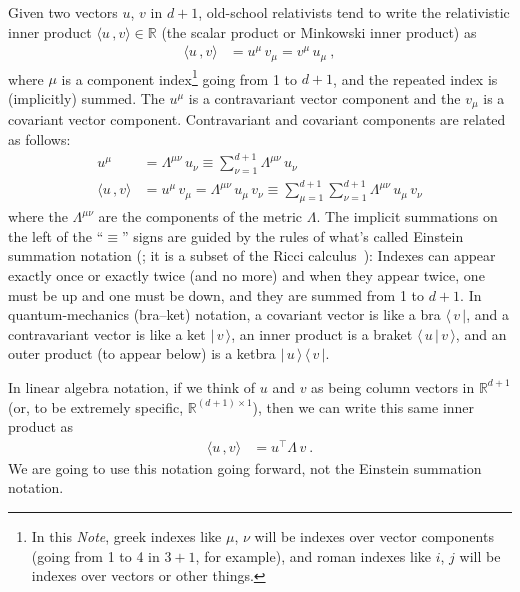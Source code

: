 \documentclass{article}
\newcommand{\inner}[2]{\langle{#1}\,,{#2}\rangle}
\newcommand{\bra}[1]{\langle\,{#1}\,|}
\newcommand{\ket}[1]{|\,{#1}\,\rangle}
\newcommand{\braket}[2]{\langle\,{#1}\,|\,{#2}\,\rangle}
\newcommand{\ketbra}[2]{|\,{#1}\,\rangle\,\langle\,{#2}\,|}
\newcommand{\plus}{\!+\!} %
\newcommand{\documentname}{\textsl{Note}}
\begin{document}
Given two vectors $u$, $v$ in $d\plus1$, old-school relativists tend to write the relativistic inner product $\inner{u}{v}\in\mathbb{R}$ (the scalar product or Minkowski inner product) as
\begin{align}
    \inner{u}{v} &= u^\mu\,v_\mu = v^\mu\,u_\mu ~,
\end{align}
where $\mu$ is a component index\footnote{In this \documentname{}, greek indexes like $\mu$, $\nu$ will be indexes over vector components (going from 1 to 4 in $3\plus1$, for example), and roman indexes like $i$, $j$ will be indexes over vectors or other things.} going from 1 to $d\plus1$, and the repeated index is (implicitly) summed.
The $u^\mu$ is a contravariant vector component and the $v_\mu$ is a covariant vector component.
Contravariant and covariant components are related as follows:
\begin{align}
    u^\mu &= \Lambda^{\mu\nu}\,u_\nu \equiv \sum_{\nu=1}^{d+1} \Lambda^{\mu\nu}\,u_\nu
    \\
    \inner{u}{v} &= u^\mu\,v_\mu = \Lambda^{\mu\nu}\,u_\mu\,v_\nu \equiv \sum_{\mu=1}^{d+1}\sum_{\nu=1}^{d+1} \Lambda^{\mu\nu}\,u_\mu\,v_\nu
\end{align}
where the $\Lambda^{\mu\nu}$ are the components of the metric $\Lambda$.
The implicit summations on the left of the ``$\equiv$'' signs are guided by the rules of what's called Einstein summation notation (\cite{summation}; it is a subset of the Ricci calculus~\cite{ricci}): Indexes can appear exactly once or exactly twice (and no more) and when they appear twice, one must be up and one must be down, and they are summed from 1 to $d+1$.
In quantum-mechanics (bra--ket) notation, a covariant vector is like a bra $\bra{v}$, and a contravariant vector is like a ket $\ket{v}$,
an inner product is a braket $\braket{u}{v}$, and an outer product (to appear below) is a ketbra $\ketbra{u}{v}$.

In linear algebra notation, if we think of $u$ and $v$ as being column vectors in $\mathbb{R}^{d+1}$ (or, to be extremely specific, $\mathbb{R}^{(d+1)\times 1}$), then we can write this same inner product as
\begin{align}\label{eq:inner}
    \inner{u}{v} &= u^\top\Lambda\,v ~.
\end{align}
We are going to use this notation going forward, not the Einstein summation notation.
\end{document}
